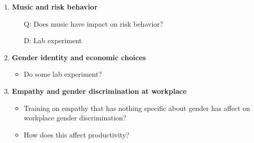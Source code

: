 \documentclass[12pt]{article}
\begin{document}
\begin{enumerate}
	\item \textbf{Music and risk behavior}
		\begin{itemize}
			\item[Q:] Does music have impact on risk behavior?
			\item[D:] Lab experiment 
		\end{itemize}
	
	\item \textbf{Gender identity and economic choices}
		\begin{itemize}
			\item Do some lab experiment?
		\end{itemize}

	\item \textbf{Empathy and gender discrimination at workplace}
	\begin{itemize}
		\item Training on empathy that has nothing specific about gender has affect on workplace gender discrimination?
		\item How does this affect productivity?
	\end{itemize}




\end{enumerate}
\end{document}
